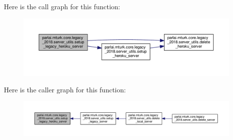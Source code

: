 Here is the call graph for this function\+:
\nopagebreak
\begin{figure}[H]
\begin{center}
\leavevmode
\includegraphics[width=350pt]{namespaceparlai_1_1mturk_1_1core_1_1legacy__2018_1_1server__utils_afc4023facc69584377d833fe79afe922_cgraph}
\end{center}
\end{figure}
Here is the caller graph for this function\+:
\nopagebreak
\begin{figure}[H]
\begin{center}
\leavevmode
\includegraphics[width=350pt]{namespaceparlai_1_1mturk_1_1core_1_1legacy__2018_1_1server__utils_afc4023facc69584377d833fe79afe922_icgraph}
\end{center}
\end{figure}
\mbox{\label{namespaceparlai_1_1mturk_1_1core_1_1legacy__2018_1_1server__utils_ace7161b60dc11e273f8da7ef409abadf}} 
